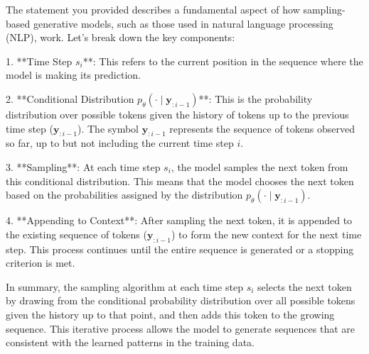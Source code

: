 The statement you provided describes a fundamental aspect of how sampling-based generative models, such as those used in natural language processing (NLP), work. Let's break down the key components:

1. **Time Step \( s_i \)**: This refers to the current position in the sequence where the model is making its prediction.

2. **Conditional Distribution \( p_\theta(\cdot \mid \boldsymbol{y}_{:i-1}) \)**: This is the probability distribution over possible tokens given the history of tokens up to the previous time step (\( \boldsymbol{y}_{:i-1} \)). The symbol \( \boldsymbol{y}_{:i-1} \) represents the sequence of tokens observed so far, up to but not including the current time step \( i \).

3. **Sampling**: At each time step \( s_i \), the model samples the next token from this conditional distribution. This means that the model chooses the next token based on the probabilities assigned by the distribution \( p_\theta(\cdot \mid \boldsymbol{y}_{:i-1}) \).

4. **Appending to Context**: After sampling the next token, it is appended to the existing sequence of tokens (\( \boldsymbol{y}_{:i-1} \)) to form the new context for the next time step. This process continues until the entire sequence is generated or a stopping criterion is met.

In summary, the sampling algorithm at each time step \( s_i \) selects the next token by drawing from the conditional probability distribution over all possible tokens given the history up to that point, and then adds this token to the growing sequence. This iterative process allows the model to generate sequences that are consistent with the learned patterns in the training data.